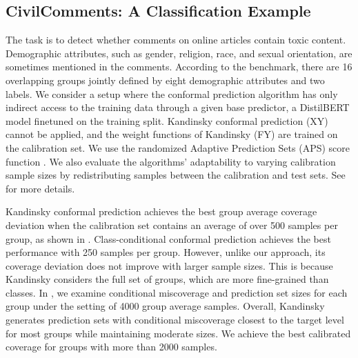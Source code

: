 \subsection{CivilComments: A Classification Example}
The task is to detect whether comments on online articles contain toxic content.  Demographic attributes, such as gender, religion, race, and sexual orientation, are sometimes mentioned in the comments. According to the \citet{Koh21} benchmark, there are 16 overlapping groups jointly defined by eight demographic attributes and two labels. We consider a setup where the conformal prediction algorithm has only indirect access to the training data through a given base predictor, a DistilBERT model finetuned on the training split. Kandinsky conformal prediction (XY) cannot be applied, and the weight functions of Kandinsky (FY) are trained on the calibration set. We use the randomized Adaptive Prediction Sets (APS) score function \citep{RSC20,DABJT23}. We also evaluate the algorithms’ adaptability to varying calibration sample sizes by redistributing samples between the calibration and test sets. See  for more details.

Kandinsky conformal prediction achieves the best group average coverage deviation when the calibration set contains an average of over 500 samples per group, as shown in . Class-conditional conformal prediction achieves the best performance with 250 samples per group. However, unlike our approach, its coverage deviation does not improve with larger sample sizes. This is because Kandinsky considers the full set of groups, which are more fine-grained than classes. In , we examine conditional miscoverage and prediction set sizes for each group under the setting of 4000 group average samples. Overall, Kandinsky generates prediction sets with conditional miscoverage closest to the target level for most groups while maintaining moderate sizes. We achieve the best calibrated coverage for groups with more than 2000 samples.




